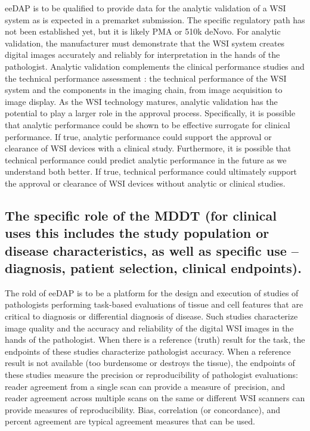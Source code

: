 \documentclass{article}%
\begin{document}
eeDAP is to be qualified to provide data for the analytic validation of a WSI
system as is expected in a premarket submission. The specific regulatory path
has not been established yet, but it is likely PMA or 510k deNovo. For
analytic validation, the manufacturer must demonstrate that the WSI system
creates digital images accurately and reliably for interpretation in the hands
of the pathologist. Analytic validation complements the clinical performance
studies and the technical performance assessment
\cite{FDA2016_Guidance-DigiPathTechnical}: the technical performance of the
WSI system and the components in the imaging chain, from image acquisition to
image display. As the WSI technology matures, analytic validation has the
potential to play a larger role in the approval process. Specifically, it is
possible that analytic performance could be shown to be effective surrogate
for clinical performance. If true, analytic performance could support the
approval or clearance of WSI devices with a clinical study. Furthermore, it is
possible that technical performance could predict analytic performance in the
future as we understand both better. If true, technical performance could
ultimately support the approval or clearance of WSI devices without analytic
or clinical studies.

\subsection{The specific role of the MDDT (for clinical uses this includes the
study population or disease characteristics, as well as specific use --
diagnosis, patient selection, clinical endpoints).}

\label{the-specific-role-of-the-mddt-for-clinical-uses-this-includes-the-study-population-or-disease-characteristics-as-well-as-specific-use-diagnosis-patient-selection-clinical-endpoints.}%


The rold of eeDAP is to be a platform for the design and execution of studies
of pathologists performing task-based evaluations of tissue and cell features
that are critical to diagnosis or differential diagnosis of disease. Such
studies characterize image quality and the accuracy and reliability of the
digital WSI images in the hands of the pathologist. When there is a reference
(truth) result for the task, the endpoints of these studies characterize
pathologist accuracy. When a reference result is not available (too burdensome
or destroys the tissue), the endpoints of these studies measure the precision
or reproducibility of pathologist evaluations: reader agreement from a single
scan can provide a measure of\ precision, and reader agreement across multiple
scans on the same or different WSI scanners can provide measures of
reproducibility. Bias, correlation (or concordance), and percent agreement are
typical agreement measures that can be used.
\end{document}
